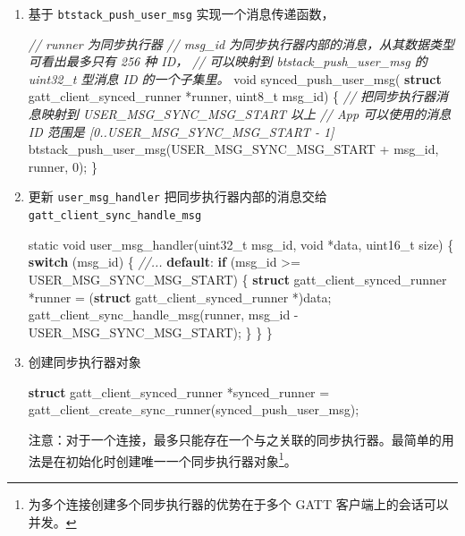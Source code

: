 \documentclass[
  12pt,
]{book}
\newenvironment{Shaded}{\begin{snugshade}}{\end{snugshade}}
\newcommand{\CommentTok}[1]{\textcolor[rgb]{0.56,0.35,0.01}{\textit{#1}}}
\newcommand{\ControlFlowTok}[1]{\textcolor[rgb]{0.13,0.29,0.53}{\textbf{#1}}}
\newcommand{\DataTypeTok}[1]{\textcolor[rgb]{0.13,0.29,0.53}{#1}}
\newcommand{\DecValTok}[1]{\textcolor[rgb]{0.00,0.00,0.81}{#1}}
\newcommand{\KeywordTok}[1]{\textcolor[rgb]{0.13,0.29,0.53}{\textbf{#1}}}
\newcommand{\NormalTok}[1]{#1}
\begin{document}
\begin{enumerate}
\def\labelenumi{\arabic{enumi}.}
\item
  基于 \texttt{btstack\_push\_user\_msg} 实现一个消息传递函数，

\begin{Shaded}
\begin{Highlighting}[]
\CommentTok{// runner 为同步执行器}
\CommentTok{// msg_id 为同步执行器内部的消息，从其数据类型可看出最多只有 256 种 ID，}
\CommentTok{// 可以映射到 btstack_push_user_msg 的 uint32_t 型消息 ID 的一个子集里。}
\DataTypeTok{void}\NormalTok{ synced_push_user_msg(}
    \KeywordTok{struct}\NormalTok{ gatt_client_synced_runner *runner,}
    \DataTypeTok{uint8_t}\NormalTok{ msg_id)}
\NormalTok{\{}
    \CommentTok{// 把同步执行器消息映射到 USER_MSG_SYNC_MSG_START 以上}
    \CommentTok{// App 可以使用的消息 ID 范围是 [0..USER_MSG_SYNC_MSG_START - 1]}
\NormalTok{    btstack_push_user_msg(USER_MSG_SYNC_MSG_START + msg_id,}
\NormalTok{        runner, }\DecValTok{0}\NormalTok{);}
\NormalTok{\}}
\end{Highlighting}
\end{Shaded}
\item
  更新 \texttt{user\_msg\_handler} 把同步执行器内部的消息交给 \texttt{gatt\_client\_sync\_handle\_msg}

\begin{Shaded}
\begin{Highlighting}[]
\DataTypeTok{static} \DataTypeTok{void}\NormalTok{ user_msg_handler(}\DataTypeTok{uint32_t}\NormalTok{ msg_id, }\DataTypeTok{void}\NormalTok{ *data,}
    \DataTypeTok{uint16_t}\NormalTok{ size)}
\NormalTok{\{}
    \ControlFlowTok{switch}\NormalTok{ (msg_id)}
\NormalTok{    \{}
    \CommentTok{//...}
    \ControlFlowTok{default}\NormalTok{:}
        \ControlFlowTok{if}\NormalTok{ (msg_id >= USER_MSG_SYNC_MSG_START)}
\NormalTok{        \{}
            \KeywordTok{struct}\NormalTok{ gatt_client_synced_runner *runner =}
\NormalTok{                (}\KeywordTok{struct}\NormalTok{ gatt_client_synced_runner *)data;}
\NormalTok{            gatt_client_sync_handle_msg(runner,}
\NormalTok{                msg_id - USER_MSG_SYNC_MSG_START);}
\NormalTok{        \}}
\NormalTok{    \}}
\NormalTok{\}}
\end{Highlighting}
\end{Shaded}
\item
  创建同步执行器对象

\begin{Shaded}
\begin{Highlighting}[]
\KeywordTok{struct}\NormalTok{ gatt_client_synced_runner *synced_runner =}
\NormalTok{    gatt_client_create_sync_runner(synced_push_user_msg);}
\end{Highlighting}
\end{Shaded}

  注意：对于一个连接，最多只能存在一个与之关联的同步执行器。最简单的用法是在初始化时创建唯一一个同步执行器对象\footnote{为多个连接创建多个同步执行器的优势在于多个 GATT 客户端上的会话可以并发。}。
\end{enumerate}
\end{document}
